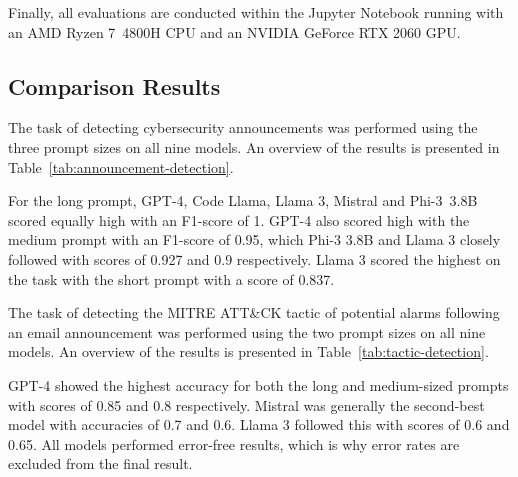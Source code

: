 Finally, all evaluations are conducted within the Jupyter Notebook running with an AMD Ryzen 7\ 4800H CPU and an NVIDIA
GeForce RTX 2060 GPU\@.

\subsection{Comparison Results}
\label{subsec:rq3-comparison-results}

The task of detecting cybersecurity announcements was performed using the three prompt sizes on all nine models.
An overview of the results is presented in Table\ \ref{tab:announcement-detection}.



For the long prompt, GPT-4, Code Llama, Llama 3, Mistral and Phi-3\ 3.8B scored equally high with an F1-score of 1.
GPT-4 also scored high with the medium prompt with an F1-score of 0.95, which Phi-3 3.8B and Llama 3 closely followed
with scores of 0.927 and 0.9 respectively.
Llama 3 scored the highest on the task with the short prompt with a score of 0.837.

The task of detecting the MITRE ATT\&CK tactic of potential alarms following an email announcement was performed using
the two prompt sizes on all nine models.
An overview of the results is presented in Table\ \ref{tab:tactic-detection}.



GPT-4 showed the highest accuracy for both the long and medium-sized prompts with scores of 0.85 and 0.8 respectively.
Mistral was generally the second-best model with accuracies of 0.7 and 0.6.
Llama 3 followed this with scores of 0.6 and 0.65.
All models performed error-free results, which is why error rates are excluded from the final result.